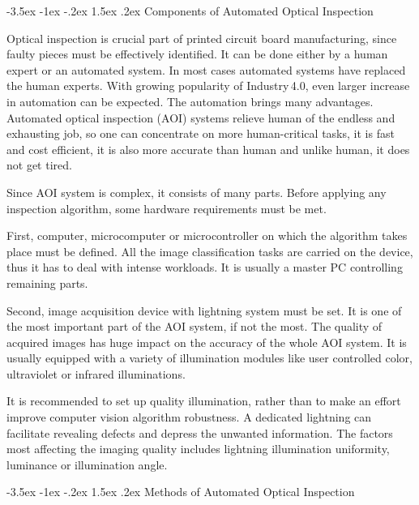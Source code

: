 \documentclass[a4paper,10pt]{article}
\makeatletter
\theoremstyle{definition}
\renewcommand\section{\@startsection {section}{1}{\z@}%
	{-3.5ex \@plus -1ex \@minus -.2ex}%
	{1.5ex \@plus.2ex}%
	{\large\bfseries}}
\makeatother
\begin{document}
	\section{Components of Automated Optical Inspection}
	\label{sec:4}
	
	Optical inspection is crucial part of printed circuit board manufacturing, since faulty pieces must be effectively identified. It can be done either by a human expert or an automated system. In most cases automated systems have replaced the human experts. With growing popularity of Industry\,4.0, even larger increase in automation can be expected. The automation brings many advantages. Automated optical inspection (AOI) systems relieve human of the endless and exhausting job, so one can concentrate on more human-critical tasks, it is fast and cost efficient, it is also more accurate than human and unlike human, it does not get tired. \cite{richter_streitferdt}\cite{moganti_ercal}
	
	Since AOI system is complex, it consists of many parts. Before applying any inspection algorithm, some hardware requirements must be met.
	
	First, computer, microcomputer or microcontroller on which the algorithm takes place must be defined. All the image classification tasks are carried on the device, thus it has to deal with intense workloads. It is usually a master PC controlling remaining parts. 
	
	Second, image acquisition device with lightning system must be set. It is one of the most important part of the AOI system, if not the most. The quality of acquired images has huge impact on the accuracy of the whole AOI system. It is usually equipped with a variety of illumination modules like user controlled color, ultraviolet or infrared illuminations. \cite{richter_streitferdt}\cite{lu_shi}
	
	It is recommended to set up quality illumination, rather than to make an effort improve computer vision algorithm robustness. A dedicated lightning can facilitate revealing defects and depress the unwanted information. The factors most affecting the imaging quality includes lightning illumination uniformity, luminance or illumination angle. \cite{lu_shi}
	
	\section{Methods of Automated Optical Inspection}
	\label{sec:5}
	
\end{document}
